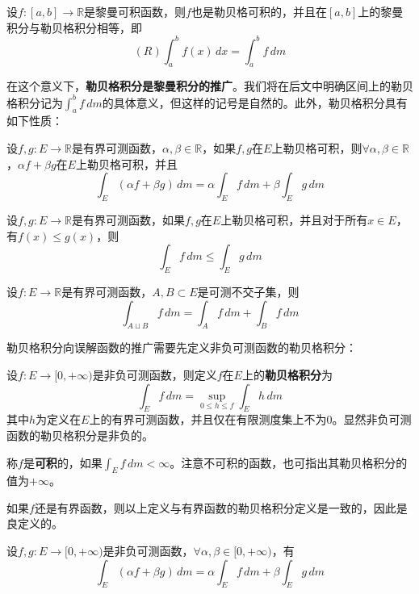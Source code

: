 \begin{theorem}
    设$f:[a,b]\to\mathbb{R}$是黎曼可积函数，则$f$也是勒贝格可积的，并且在$[a,b]$上的黎曼积分与勒贝格积分相等，即
    \[(R)\int_{a}^{b}f(x)\,dx=\int_{a}^{b}f\,dm\]
\end{theorem}

在这个意义下，\textbf{勒贝格积分是黎曼积分的推广}。我们将在后文中明确区间上的勒贝格积分记为$\int_{a}^{b}f\,dm$的具体意义，但这样的记号是自然的。此外，勒贝格积分具有如下性质：
\begin{proposition}[有界可测函数的勒贝格积分的线性性]
    设$f,g:E\to\mathbb{R}$是有界可测函数，$\alpha,\beta\in\mathbb{R}$，如果$f,g$在$E$上勒贝格可积，则$\forall \alpha,\beta\in\mathbb{R}$，$\alpha f+\beta g$在$E$上勒贝格可积，并且
    \[\int_{E}(\alpha f+\beta g)\,dm=\alpha\int_{E}f\,dm+\beta\int_{E}g\,dm\]
\end{proposition}
\begin{corollary}[有界可测函数的勒贝格积分的单调性]
    设$f,g:E\to\mathbb{R}$是有界可测函数，如果$f,g$在$E$上勒贝格可积，并且对于所有$x\in E$，有$f(x)\leq g(x)$，则
    \[\int_{E}f\,dm\leq \int_{E}g\,dm\]
\end{corollary}
\begin{corollary}[有界可测函数的勒贝格积分的区域可加性]
    设$f:E\to\mathbb{R}$是有界可测函数，$A,B\subset E$是可测不交子集，则
    \[\int_{A\sqcup B}f\,dm=\int_{A}f\,dm+\int_{B}f\,dm\]
\end{corollary}

勒贝格积分向误解函数的推广需要先定义非负可测函数的勒贝格积分：

\begin{definition}[非负可测函数的勒贝格积分]
    设$f:E\to[0,+\infty)$是非负可测函数，则定义$f$在$E$上的\textbf{勒贝格积分}为
    \[\int_{E}f\,dm=\sup_{0\leq h\leq f}\int_{E}h\,dm\]
    其中$h$为定义在$E$上的有界可测函数，并且仅在有限测度集上不为0。显然非负可测函数的勒贝格积分是非负的。
    
    称$f$是\textbf{可积}的，如果$\int_{E}f\,dm<\infty$。注意不可积的函数，也可指出其勒贝格积分的值为$+\infty$。
\end{definition}

如果$f$还是有界函数，则以上定义与有界函数的勒贝格积分定义是一致的，因此是良定义的。

\begin{theorem}[非负可测函数的勒贝格积分的线性性]
    设$f,g:E\to[0,+\infty)$是非负可测函数，$\forall\alpha,\beta\in[0,+\infty)$，有
    \[\int_{E}(\alpha f+\beta g)\,dm=\alpha\int_{E}f\,dm+\beta\int_{E}g\,dm\]
\end{theorem}

